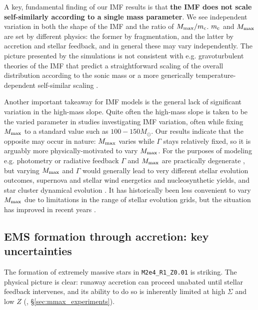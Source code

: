 \documentclass[apjl,twocolumn]{openjournal}
\begin{document}
A key, fundamental finding of our IMF results is that {\bf the IMF does not scale self-similarly according to a single mass parameter}. We see independent variation in both the shape of the IMF and the ratio of $M_{\rm max}/m_{\rm c}$. $m_{\rm c}$ and $M_{\rm max}$ are set by different physics: the former by fragmentation, and the latter by accretion and stellar feedback, and in general these may vary independently. The picture presented by the simulations is not consistent with e.g. gravoturbulent theories of the IMF that predict a straightforward scaling of the overall distribution according to the sonic mass \citep{hopkins:2013.imf.variation,chabrier_hennebelle_2014} or a more generically temperature-dependent self-similar scaling \citep{jermyn:2018.temp.dept.imf}. 

Another important takeaway for IMF models is the general lack of significant variation in the high-mass slope. Quite often the high-mass slope is taken to be the varied parameter in studies investigating IMF variation, often while fixing $M_{\rm max}$ to a standard value such as $100-150M_\odot$. Our results indicate that the opposite may occur in nature: $M_{\rm max}$ varies while $\Gamma$ stays relatively fixed, so it is arguably more physically-motivated to vary $M_{\rm max}$. For the purposes of modeling e.g. photometry or radiative feedback $\Gamma$ and $M_{\rm max}$ are practically degenerate \citep{menon:2024.imf.feedback}, but varying $M_{\rm max}$ and $\Gamma$ would generally lead to very different stellar evolution outcomes, supernova and stellar wind energetics and nucleosynthetic yields, and star cluster dynamical evolution \citep[e.g.][]{weatherford:2021.cluster.imf}. It has historically been less convenient to vary $M_{\rm max}$ due to limitations in the range of stellar evolution grids, but the situation has improved in recent years \citep[e.g.][]{boost.tracks}.



\subsection{EMS formation through accretion: key uncertainties}
\label{sec:ems_formation_details}
The formation of extremely massive stars in \texttt{M2e4\_R1\_Z0.01} is striking. The physical picture is clear: runaway accretion can proceed unabated until stellar feedback intervenes, and its ability to do so is inherently limited at high $\Sigma$ and low $Z$ (\citealt{grudic:2023.does.god.play.dice}, \S\ref{sec:mmax_experiments}).
\end{document}
